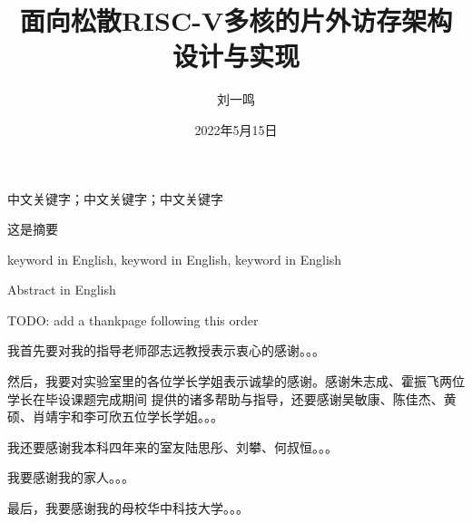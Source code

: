 \documentclass[supercite,notofont]{HustGraduPaper}
\title{面向松散RISC-V多核的片外访存架构设计与实现}
\author{刘一鸣}
\date{2022年5月15日}
\begin{document}


\maketitle

\statement

\clearpage


\begin{cnabstract}{中文关键字；中文关键字；中文关键字}

这是摘要

\end{cnabstract}

\begin{enabstract}{keyword in English, keyword in English, keyword in English}

Abstract in English

\end{enabstract}

\tableofcontents[level=2]

\clearpage





% 
% 
% 

\begin{thankpage}

TODO: add a thankpage following this order

我首先要对我的指导老师邵志远教授表示衷心的感谢。。。

然后，我要对实验室里的各位学长学姐表示诚挚的感谢。感谢朱志成、霍振飞两位学长在毕设课题完成期间
提供的诸多帮助与指导，还要感谢吴敏康、陈佳杰、黄硕、肖靖宇和李可欣五位学长学姐。。。

我还要感谢我本科四年来的室友陆思彤、刘攀、何叔恒。。。

我要感谢我的家人。。。

最后，我要感谢我的母校华中科技大学。。。


\end{thankpage}


\end{document}
